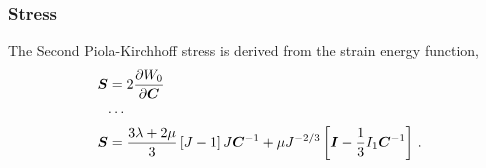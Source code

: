 \documentclass[10pt,letterpaper,oneside]{report}
\newcommand{\ten}[1]{\mbox{\boldmath $#1$}{}}
\begin{document}
\subsubsection{Stress}
The Second Piola-Kirchhoff stress is derived from the strain energy function, 
\begin{align}
\ten{S} ={}& 2 \frac{\partial W_0}{\partial \ten{C}}  
\\
\cdots{}& \notag \\
\ten{S} ={}& \frac{3 \lambda + 2 \mu}{3} \left[ J - 1 \right] J \ten{C}^{-1} + \mu J^{-2/3} \left[ \ten{I} - \frac{1}{3} I_1 \ten{C}^{-1} \right] \, . 
\end{align}
\end{document}
